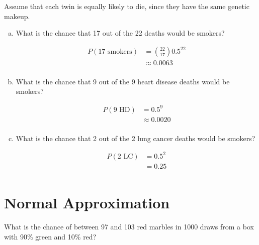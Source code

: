 \documentclass[landscape]{exam}
\begin{document}
\begin{enumerate}
      Assume that each twin is equally likely to die, since they have the same
      genetic makeup.

      \begin{enumerate}[(a)]
        \item What is the chance that 17 out of the 22 deaths would be smokers?
          \begin{solution}
            \begin{align*}
              P(\text{17 smokers}) & = \binom{22}{17} 0.5^{22} \\
                                   & \approx \boxed{ 0.0063 } \\
            \end{align*}
          \end{solution}

        \item What is the chance that 9 out of the 9 heart disease deaths would
          be smokers?
          \begin{solution}
            \begin{align*}
              P(\text{9 HD}) & = 0.5^{9} \\
                                   & \approx \boxed{ 0.0020 } \\
            \end{align*}
          \end{solution}

        \item What is the chance that 2 out of the 2 lung cancer deaths would
          be smokers?
          \begin{solution}
            \begin{align*}
              P(\text{2 LC}) & = 0.5^{2} \\
                                   & = \boxed{ 0.25 } \\
            \end{align*}
          \end{solution}

      \end{enumerate}
  \end{enumerate}

  \section{Normal Approximation}

  What is the chance of between 97 and 103 red marbles in 1000 draws from a box
  with 90\% green and 10\% red?
\end{document}
